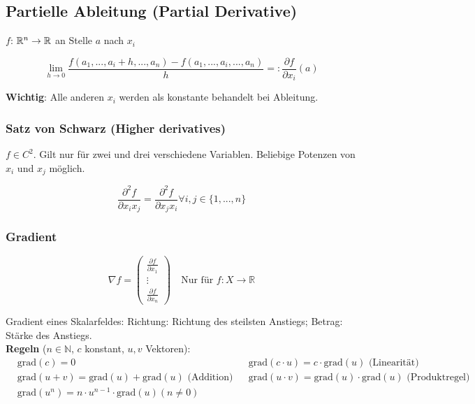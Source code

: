\subsection{Partielle Ableitung (Partial Derivative)}

$f$: $\mathbb{R}^n \rightarrow \mathbb{R}$ an Stelle $a$ nach $x_i$

\[
    \lim_{h \rightarrow 0} \frac{f(a_1, ..., a_i + h, ..., a_n) - f(a_1, ..., a_i, ..., a_n)}{h} =: \frac{\partial f}{\partial x_i}(a)
\]

\textbf{Wichtig}: Alle anderen $x_i$ werden als konstante behandelt bei Ableitung.

\subsubsection{Satz von Schwarz (Higher derivatives)}

$f \in C^2$. Gilt nur für zwei und drei verschiedene Variablen. Beliebige Potenzen von $x_i$ und $x_j$ möglich.

\[
    \frac{\partial^2 f}{\partial x_i x_j} = \frac{\partial^2 f}{\partial x_j x_i} \forall i, j \in \{1, ..., n\}
\]


\subsubsection{Gradient}

\[
    \nabla f =
        \begin{pmatrix}
            \frac{\partial f}{\partial x_1}\\
            \vdots\\
            \frac{\partial f}{\partial x_n}
        \end{pmatrix} \quad \text{Nur für } f: X \rightarrow \mathbb{R}
\]

Gradient eines Skalarfeldes: Richtung: Richtung des steilsten Anstiegs; Betrag: Stärke des Anstiegs.\\

\textbf{Regeln} ($n \in \mathbb{N}$, $c$ konstant, $u, v$ Vektoren):
\begin{align*}
    &\text{grad}(c) = 0 &
    &\text{grad}(c \cdot u) = c \cdot \text{grad}(u) \text{  (Linearität)} \\
    &\text{grad}(u + v) = \text{grad}(u) + \text{grad}(u) \text{  (Addition)} &
    &\text{grad}(u \cdot v) = \text{grad}(u) \cdot \text{grad}(u) 
    \text{  (Produktregel)} \\
    &\text{grad}(u^n) = n \cdot u^{n-1} \cdot \text{grad}(u) (n\neq 0) 
\end{align*}
